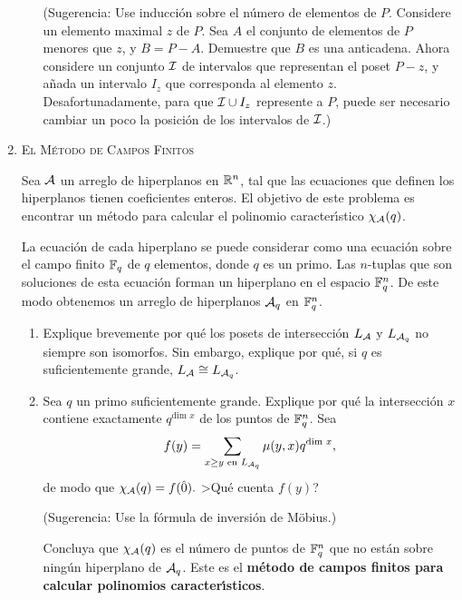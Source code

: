 \documentclass[letterpaper,10pt]{article}
\begin{document}
\begin{enumerate}
\begin{enumerate}
(Sugerencia: Use inducci\'{o}n sobre el n\'{u}mero de elementos de
$P$. Considere un elemento maximal $z$ de $P$. Sea $A$ el conjunto
de elementos de $P$ menores que $z$, y $B = P-A$. Demuestre que
$B$ es una anticadena. Ahora considere un conjunto $\cal I$ de
intervalos que representan el poset $P-z$, y a\~{n}ada un
intervalo $I_z$ que corresponda al elemento $z$.
Desafortunadamente, para que ${\cal I} \cup I_z$ represente a $P$,
puede ser necesario cambiar un poco la posici\'{o}n de los
intervalos de $\cal I$.)
\end{enumerate}


\newpage
\item \textsc{El M{\'e}todo de Campos Finitos}

Sea $\cal A$ un arreglo de hiperplanos en $\Bbb R^n$, tal que las
ecuaciones que definen los hiperplanos tienen coeficientes
enteros. El objetivo de este problema es encontrar un m{\'e}todo
para calcular el polinomio caracter{\'\i}stico $\chi_{\cal A}(q)$.

La ecuaci{\'o}n de cada hiperplano se puede considerar como una
ecuaci{\'o}n sobre el campo finito $\Bbb F_q$ de $q$ elementos,
donde $q$ es un primo. Las $n$-tuplas que son soluciones de esta
ecuaci{\'o}n forman un hiperplano en el espacio $\Bbb F_q^n$. De
este modo obtenemos un arreglo de hiperplanos ${\cal A}_q$ en
$\Bbb F_q^n$.

\begin{enumerate}

\item Explique brevemente por qu\'{e} los posets de
intersecci\'{o}n $L_{\cal A}$ y $L_{{\cal A}_q}$ no siempre son
isomorfos. Sin embargo, explique por qu\'{e}, si $q$ es
suficientemente grande, $L_{\cal A} \cong L_{{\cal A}_q}$.

\item Sea $q$ un primo suficientemente grande. Explique por
qu{\'e} la intersecci{\'o}n $x$ contiene exactamente
$q^{\mathrm{dim }\,\, x}$ de los puntos de $\Bbb F_q^n$. Sea
$$
f(y) = \sum_{x \geq y \,\, \mathrm{en} \,\, L_{{\cal A}_q}} \mu(y,
x) q^{\mathrm{dim }\,\, x},
$$
de modo que $\chi_{\cal A}(q) = f(\hat{0}).$ >Qu{\'e} cuenta
$f(y)$?

(Sugerencia: Use la f{\'o}rmula de inversi{\'o}n de M{\"o}bius.)


Concluya que $\chi_{\cal A}(q)$ es el n{\'u}mero de puntos de
$\Bbb F_q^n$ que no est{\'a}n sobre ning{\'u}n hiperplano de
${\cal A}_q$. Este es el {\bf m{\'e}todo de campos finitos para
calcular polinomios caracter{\'\i}sticos}.


\end{enumerate}
\end{enumerate}
\end{document}
